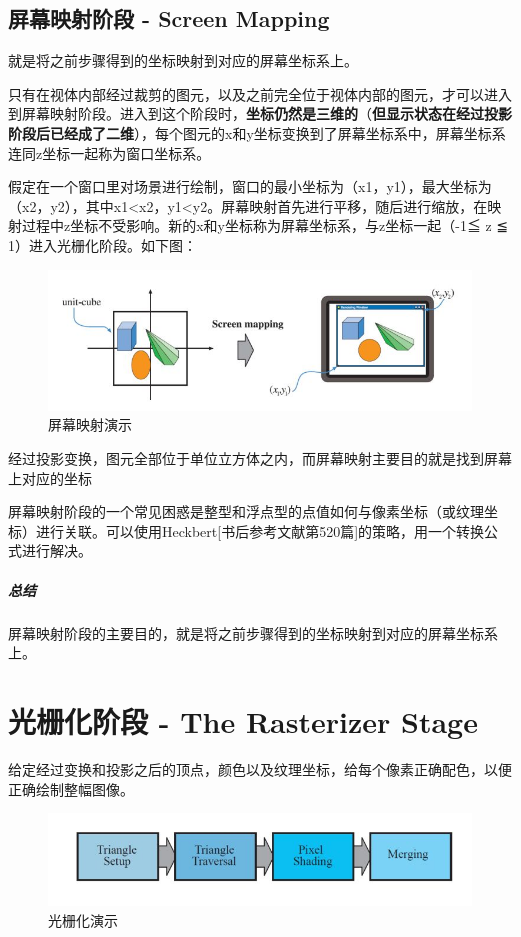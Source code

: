 \documentclass[UTF8,a4paper,12pt]{ctexbook}
\begin{document}
		\subsection{屏幕映射阶段 - Screen Mapping} 
			就是将之前步骤得到的坐标映射到对应的屏幕坐标系上。
		
			只有在视体内部经过裁剪的图元，以及之前完全位于视体内部的图元，才可以进入到屏幕映射阶段。进入到这个阶段时，\textbf{坐标仍然是三维的}（\textbf{但显示状态在经过投影阶段后已经成了二维}），每个图元的x和y坐标变换到了屏幕坐标系中，屏幕坐标系连同z坐标一起称为窗口坐标系。
			
			假定在一个窗口里对场景进行绘制，窗口的最小坐标为（x1，y1），最大坐标为（x2，y2），其中x1<x2，y1<y2。屏幕映射首先进行平移，随后进行缩放，在映射过程中z坐标不受影响。新的x和y坐标称为屏幕坐标系，与z坐标一起（-1≦ z ≦ 1）进入光栅化阶段。如下图：
			
				\begin{figure}[H]
					\centering
					\includegraphics[scale=0.57]{scMap}
					\caption{屏幕映射演示}
				\end{figure}
	
			经过投影变换，图元全部位于单位立方体之内，而屏幕映射主要目的就是找到屏幕上对应的坐标
			
			屏幕映射阶段的一个常见困惑是整型和浮点型的点值如何与像素坐标（或纹理坐标）进行关联。可以使用Heckbert[书后参考文献第520篇]的策略，用一个转换公式进行解决。
			
			\subparagraph{总结}屏幕映射阶段的主要目的，就是将之前步骤得到的坐标映射到对应的屏幕坐标系上。
			
	\section{光栅化阶段 - The Rasterizer Stage}
		给定经过变换和投影之后的顶点，颜色以及纹理坐标，给每个像素正确配色，以便正确绘制整幅图像。
			\begin{figure}[H]
				\centering
				\includegraphics[scale=0.7]{Rasterization}
				\caption{光栅化演示}
			\end{figure}
			
\end{document}
